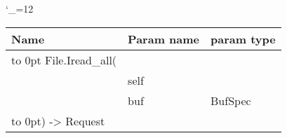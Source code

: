 \begingroup \catcode`\_=12 \tt
\begin{tabular}{lll}
\toprule
\textrm{Name}&\textrm{Param name}&\textrm{param type}\\
\midrule
\hbox to 0pt {File.Iread_all(\hss}\\
& self\\
& buf & BufSpec\\
\hbox to 0pt{) -> Request\hss}\\
\bottomrule
\end{tabular}
\endgroup
